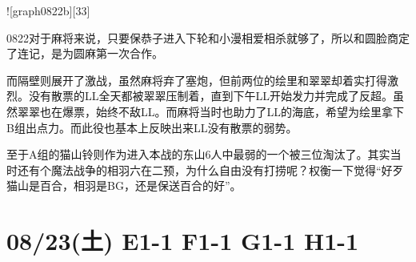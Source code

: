 
![graph0822b][33]

0822对于麻将来说，只要保恭子进入下轮和小漫相爱相杀就够了，所以和圆脸商定了连记，是为圆麻第一次合作。

而隔壁则展开了激战，虽然麻将弃了塞炮，但前两位的绘里和翠翠却着实打得激烈。没有散票的LL全天都被翠翠压制着，直到下午LL开始发力并完成了反超。虽然翠翠也在爆票，始终不敌LL。而麻将当时也助力了LL的海底，希望为绘里拿下B组出点力。而此役也基本上反映出来LL没有散票的弱势。

至于A组的猫山铃则作为进入本战的东山6人中最弱的一个被三位淘汰了。其实当时还有个魔法战争的相羽六在二预，为什么自由没有打捞呢？权衡一下觉得“好歹猫山是百合，相羽是BG，还是保送百合的好”。

\section{08/23(土) E1-1 F1-1 G1-1 H1-1}

